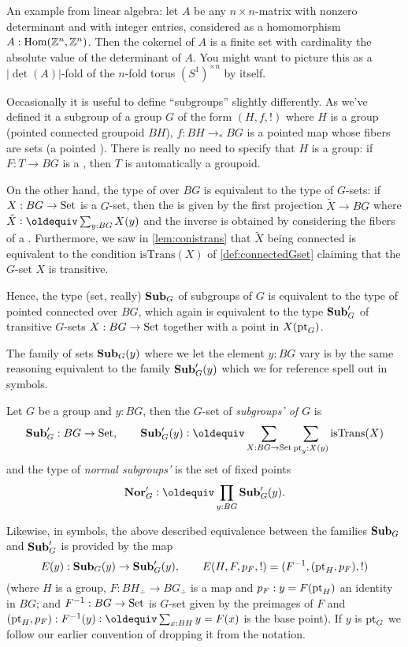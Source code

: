 \begin{example}
  An example from linear algebra: let $A$ be any $n\times n$-matrix with nonzero determinant and with integer entries, considered as a homomorphism $A:\mathrm{Hom}(\mathbb{Z}^n,\mathbb{Z}^n)$.  Then the cokernel of $A$ is a finite set with cardinality the absolute value of the determinant of $A$.  You might want to picture this as a $|\det(A)|$-fold \covering of the $n$-fold torus $(S^1)^{\times n}$ by itself.
\end{example}




Occasionally it is useful to define ``subgroups'' slightly differently.
As we've defined it a subgroup of a group $G$ of the form $(H,f,!)$ where $H$ is a group (pointed connected groupoid  $BH$), $f:BH\to_* BG$ is a pointed map whose fibers are sets (a pointed \covering).  There is really no need to specify that $H$ is a group: if $F:T\to BG$ is a \covering, then $T$ is automatically a groupoid.  

On the other hand,  the type of \coverings over $BG$ is equivalent to the type of $G$-sets: if $X:BG\to\mathord{\mathrm{Set}}$ is a $G$-set, then the \covering is given by the first projection $\tilde X\to BG$ where $\tilde X\defequi\sum_{y:BG}X(y)$ and the inverse is obtained by considering the fibers of a \covering.  Furthermore, we saw in \cref{lem:conistrans} that $\tilde X$ being connected is equivalent to the condition $\mathrm{isTrans}(X)$ of \cref{def:connectedGset} claiming that the $G$-set $X$ is transitive. 

Hence, the type (set, really) $\mathbf{Sub}_G$ of subgroups of $G$ is equivalent to the type of pointed connected \coverings over $BG$, which again is equivalent to the type $\mathbf{Sub}_G'$ of transitive $G$-sets $X:BG\to\mathord{\mathrm{Set}}$ together with a point in $X(\mathrm{pt}_G)$.  

The family of sets $\mathbf{Sub}_G(y)$ where we let the element $y:BG$ vary is by the same reasoning equivalent to the family $\mathbf{Sub}_G'(y)$ which we for reference spell out in symbols.

\newcommand{\typenormal}{\mathbf{Nor}}
\begin{definition}
  Let $G$ be a group and $y:BG$, then the $G$-set of \emph{subgroups' of $G$} is
  $$\typesubgroup_G':BG\to\Set,\qquad\typesubgroup_G'(y)\defequi\sum_{X:BG\to\Set}\sum_{\pt_y:X(y)}\mathrm{isTrans}(X)$$
and the type of \emph{normal subgroups'} is the set of fixed points
$$\typenormal_G'\defequi\prod_{y:BG}\typesubgroup_G'(y).$$
\end{definition}
Likewise, in symbols, the above described equivalence between the families $\mathbf{Sub}_G$ and $\mathbf{Sub}_G'$ is provided by the map 
$$E(y):\mathbf{Sub}_G(y)\to\mathbf{Sub}_G'(y),\qquad E(H,F,p_F,!)=(F^{-1}, (\mathrm{pt}_H,p_F),!)
$$
(where $H$ is a group, $F:BH_\div\to BG_\div$ is a map and $p_F:y=F(\mathrm{pt}_H)$ an identity in $BG$; and $F^{-1}:BG\to\mathord{\mathrm{Set}}$ is $G$-set given by the preimages of $F$ and $(\pt_H,p_F):F^{-1}(y)\defequi \sum_{x:BH}y=F(x)$ is the base point).  If $y$ is $\mathrm{pt}_G$ we follow our earlier convention of dropping it from the notation.


